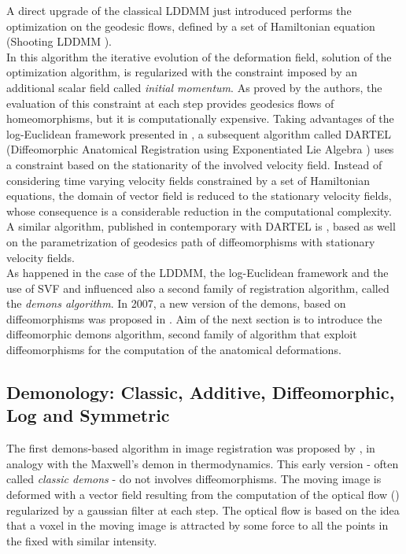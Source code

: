 A direct upgrade of the classical LDDMM just introduced performs the optimization on the geodesic flows, defined by a set of Hamiltonian equation (Shooting LDDMM \cite{vialard2012diffeomorphic}). \\
In this algorithm the iterative evolution of the deformation field, solution of the optimization algorithm, is regularized with the constraint imposed by an additional scalar field called \emph{initial momentum}. 
As proved by the authors, the evaluation of this constraint at each step provides geodesics flows of homeomorphisms, but it is computationally expensive. Taking advantages of the log-Euclidean framework presented in \cite{Arsigny:MRM:06}, a subsequent algorithm called DARTEL (Diffeomorphic Anatomical Registration using Exponentiated Lie Algebra \cite{Ashburner:07}) uses a constraint based on the stationarity of the involved velocity field. Instead of considering time varying velocity fields constrained by a set of Hamiltonian equations, the domain of vector field is reduced to the stationary velocity fields, whose consequence is a considerable reduction in the computational complexity. A similar algorithm, published in contemporary with DARTEL is \cite{hernandez2007registration}, based as well on the parametrization of geodesics path of diffeomorphisms with stationary velocity fields. \\
As happened in the case of the LDDMM, the log-Euclidean framework and the use of SVF and influenced also a second family of registration algorithm, called the \emph{demons algorithm}. In 2007, a new version of the demons, based on diffeomorphisms was proposed in \cite{vercauteren2006robust}. Aim of the next section is to introduce the diffeomorphic demons algorithm, second family of algorithm that exploit diffeomorphisms for the computation of the anatomical deformations.


\subsection{Demonology: Classic, Additive, Diffeomorphic, Log and Symmetric}

The first demons-based algorithm in image registration was proposed by \cite{thirion1998image}, in analogy with the Maxwell's demon in thermodynamics. This early version - often called \emph{classic demons} - do not involves diffeomorphisms. 
The moving image is deformed with a vector field resulting from the computation of the optical flow (\cite{horn1981determining}) regularized by a gaussian filter at each step. The optical flow is based on the idea that a voxel in the moving image is attracted by some force to all the points in the fixed with similar intensity. \\

